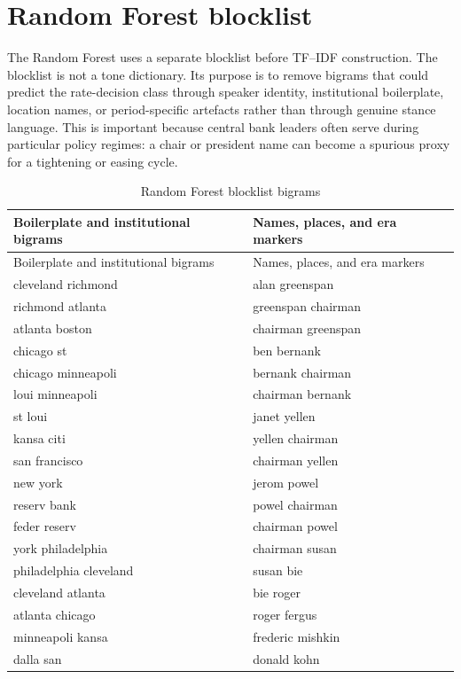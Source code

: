 \section{Random Forest blocklist}
\label{app:a1_blocklist}

The Random Forest uses a separate blocklist before TF--IDF construction. The
blocklist is not a tone dictionary. Its purpose is to remove bigrams that could
predict the rate-decision class through speaker identity, institutional
boilerplate, location names, or period-specific artefacts rather than through
genuine stance language. This is important because central bank leaders often
serve during particular policy regimes: a chair or president name can become a
spurious proxy for a tightening or easing cycle.

\begin{longtable}{p{}p{}}
\caption{Random Forest blocklist bigrams}\label{tab:a1_blocklist}\\
\toprule
Boilerplate and institutional bigrams & Names, places, and era markers \\
\midrule
\endfirsthead
\toprule
Boilerplate and institutional bigrams & Names, places, and era markers \\
\midrule
\endhead
cleveland richmond & alan greenspan \\
richmond atlanta & greenspan chairman \\
atlanta boston & chairman greenspan \\
chicago st & ben bernank \\
chicago minneapoli & bernank chairman \\
loui minneapoli & chairman bernank \\
st loui & janet yellen \\
kansa citi & yellen chairman \\
san francisco & chairman yellen \\
new york & jerom powel \\
reserv bank & powel chairman \\
feder reserv & chairman powel \\
york philadelphia & chairman susan \\
philadelphia cleveland & susan bie \\
cleveland atlanta & bie roger \\
atlanta chicago & roger fergus \\
minneapoli kansa & frederic mishkin \\
dalla san & donald kohn \\

\end{longtable}
